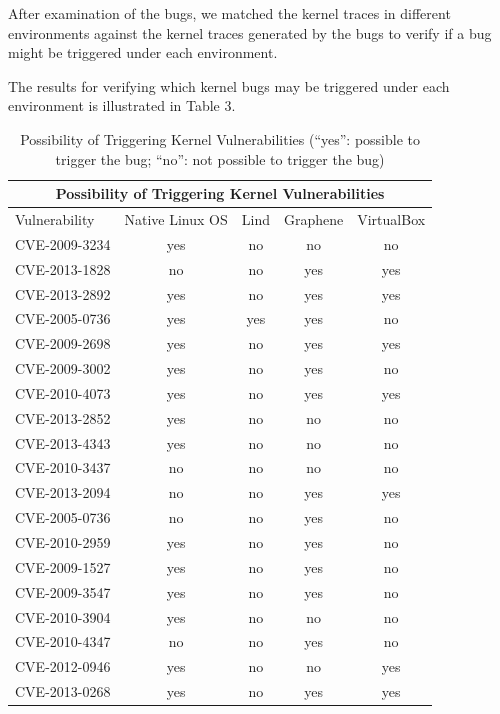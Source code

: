 After examination of the bugs, we matched the kernel traces in different environments against the kernel traces generated 
by the bugs to verify if a bug might be triggered under each environment. 

The results for verifying which kernel bugs may be triggered under each environment is illustrated in Table 3. 

\begin{table}[t]
\begin{tabular*}{\textwidth}{l @{\extracolsep{\fill}} cccc}
\toprule
\multicolumn{5}{c}{Possibility of Triggering Kernel Vulnerabilities} \\
\midrule
Vulnerability    &  Native Linux OS  &  Lind  &  Graphene & VirtualBox\\
\midrule
 CVE-2009-3234 \cite{CVE:20093234} & yes & no & no & no\\
 CVE-2013-1828 \cite{CVE:20131828} & no & no & yes & yes\\
 CVE-2013-2892 \cite{CVE:20132892} & yes & no & yes & yes\\
 CVE-2005-0736 \cite{CVE:20050736} & yes & yes & yes & no\\
 CVE-2009-2698 \cite{CVE:20092698} & yes & no & yes & yes\\
 CVE-2009-3002 \cite{CVE:20093002} & yes & no & yes & no\\
 CVE-2010-4073 \cite{CVE:20104073} & yes & no & yes & yes\\
 CVE-2013-2852 \cite{CVE:20132852} & yes & no & no & no\\
 CVE-2013-4343 \cite{CVE:20134343} & yes & no & no & no\\
 CVE-2010-3437 \cite{CVE:20103437} & no & no & no & no\\
 CVE-2013-2094 \cite{CVE:20132094} & no & no & yes & yes\\
 CVE-2005-0736 \cite{CVE:20050736} & no & no & yes & no\\
 CVE-2010-2959 \cite{CVE:20102959} & yes & no & yes & no\\
 CVE-2009-1527 \cite{CVE:20091527} & yes & no & yes & no\\
 CVE-2009-3547 \cite{CVE:20093547} & yes & no & yes & no\\
 CVE-2010-3904 \cite{CVE:20103904} & yes & no & no & no\\
 CVE-2010-4347 \cite{CVE:20104347} & no & no & yes & no\\
 CVE-2012-0946 \cite{CVE:20120946} & yes & no & no & yes\\
 CVE-2013-0268 \cite{CVE:20130268} & yes & no & yes & yes\\
\bottomrule
\end{tabular*}
\caption {Possibility of Triggering Kernel Vulnerabilities (``yes'': possible to trigger the bug; ``no'': not possible to trigger the bug)}
\label{table:trigger_vulnerabilities}
\end{table}

